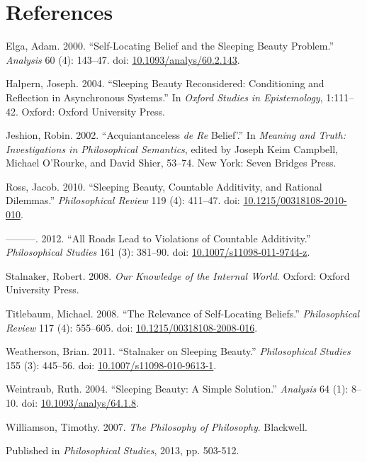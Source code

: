 \documentclass[
  10pt,
  letterpaper,
  DIV=11,
  numbers=noendperiod,
  twoside]{scrartcl}
\newlength{\cslhangindent}
\newenvironment{CSLReferences}[2] %
 {\begin{list}{}{%
  \setlength{\itemindent}{0pt}
  \setlength{\leftmargin}{0pt}
  \setlength{\parsep}{0pt}
  \ifodd #1
   \setlength{\leftmargin}{\cslhangindent}
   \setlength{\itemindent}{-1\cslhangindent}
  \fi
  \setlength{\itemsep}{#2\baselineskip}}}
 {\end{list}}
\begin{document}
\section*{References}\label{references}

\label{refs}
\begin{CSLReferences}{1}{0}
Elga, Adam. 2000. {``Self-Locating Belief and the Sleeping Beauty
Problem.''} \emph{Analysis} 60 (4): 143--47. doi:
\href{https://doi.org/10.1093/analys/60.2.143}{10.1093/analys/60.2.143}.

Halpern, Joseph. 2004. {``Sleeping Beauty Reconsidered: Conditioning and
Reflection in Asynchronous Systems.''} In \emph{Oxford Studies in
Epistemology}, 1:111--42. Oxford: Oxford University Press.

Jeshion, Robin. 2002. {``Acquiantanceless \emph{de Re} Belief'.''} In
\emph{Meaning and Truth: Investigations in Philosophical Semantics},
edited by Joseph Keim Campbell, Michael O'Rourke, and David Shier,
53--74. New York: Seven Bridges Press.

Ross, Jacob. 2010. {``Sleeping Beauty, Countable Additivity, and
Rational Dilemmas.''} \emph{Philosophical Review} 119 (4): 411--47. doi:
\href{https://doi.org/10.1215/00318108-2010-010}{10.1215/00318108-2010-010}.

---------. 2012. {``All Roads Lead to Violations of Countable
Additivity.''} \emph{Philosophical Studies} 161 (3): 381--90. doi:
\href{https://doi.org/10.1007/s11098-011-9744-z}{10.1007/s11098-011-9744-z}.

Stalnaker, Robert. 2008. \emph{Our Knowledge of the Internal World}.
Oxford: Oxford University Press.

Titlebaum, Michael. 2008. {``The Relevance of Self-Locating Beliefs.''}
\emph{Philosophical Review} 117 (4): 555--605. doi:
\href{https://doi.org/10.1215/00318108-2008-016}{10.1215/00318108-2008-016}.

Weatherson, Brian. 2011. {``Stalnaker on Sleeping Beauty.''}
\emph{Philosophical Studies} 155 (3): 445--56. doi:
\href{https://doi.org/10.1007/s11098-010-9613-1}{10.1007/s11098-010-9613-1}.

Weintraub, Ruth. 2004. {``Sleeping Beauty: A Simple Solution.''}
\emph{Analysis} 64 (1): 8--10. doi:
\href{https://doi.org/10.1093/analys/64.1.8}{10.1093/analys/64.1.8}.

Williamson, Timothy. 2007. \emph{{The Philosophy of Philosophy}}.
Blackwell.

\end{CSLReferences}



\noindent Published in\emph{
Philosophical Studies}, 2013, pp. 503-512.
\end{document}
